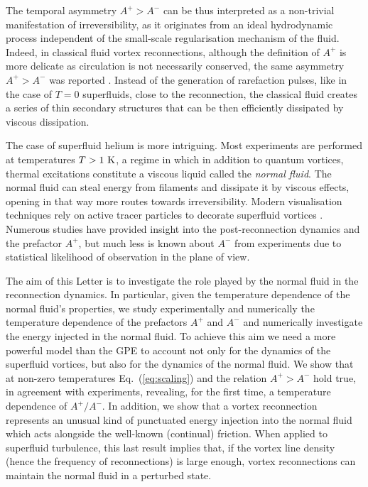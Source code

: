 \documentclass[%
 reprint,
 amsmath,amssymb,
 aps,
 prl,
]{revtex4-2}
\begin{document}
The temporal asymmetry $A^+>A^-$ can be thus interpreted as a non-trivial manifestation of irreversibility, as it originates from an ideal hydrodynamic process independent of the small-scale regularisation mechanism of the fluid.
%
Indeed, in classical fluid vortex reconnections, although the definition of $A^+$ is more delicate as circulation is not necessarily conserved, the same asymmetry $A^+>A^-$ was reported \cite{yaoSeparationScalingViscous2020}. Instead of the generation of rarefaction pulses, like in the case of $T=0$ superfluids, close to the reconnection, the classical fluid creates a series of thin secondary structures that can be then efficiently dissipated by viscous dissipation.

The case of superfluid helium is more intriguing. Most experiments are performed at temperatures $T>1~\rm K$, a regime in which in addition to quantum vortices, thermal excitations constitute a viscous liquid called the {\it normal fluid}. The normal fluid can steal energy from filaments and dissipate it by viscous effects, opening in that way more routes towards irreversibility. Modern visualisation techniques rely on active tracer particles to decorate superfluid vortices \cite{paoletti2008velocity,bewley2008,guo2014visualization,perettiDirectVisualizationQuantum2023}. Numerous studies have provided insight into the post-reconnection dynamics and the prefactor $A^{+}$, but much less is known about $A^-$ from experiments due to statistical likelihood of observation in the plane of view.

The aim of this Letter is to investigate the role played by the normal fluid in the reconnection dynamics. In particular, given the temperature dependence of the normal fluid's properties, we study experimentally and numerically the temperature dependence of the prefactors $A^+$ and $A^-$ and numerically investigate the energy injected in the normal fluid. 
%
To achieve this aim we need a more powerful model than the GPE to account not only for the dynamics of the
superfluid vortices, but also for the dynamics of the normal fluid. 
We show that at non-zero temperatures Eq.~(\ref{eq:scaling}) and the
relation $A^+>A^-$ hold true, in agreement with experiments, revealing, for the 
first time, a temperature dependence of $A^+/A^-$. In addition, we
show that a vortex
reconnection represents an unusual kind of
punctuated energy injection into the normal fluid which acts alongside
the well-known (continual) friction.
When applied to superfluid turbulence, this last result implies that,
if the vortex line density (hence the frequency of reconnections) 
is large enough, vortex
reconnections can maintain the normal fluid in a perturbed state.
\end{document}
